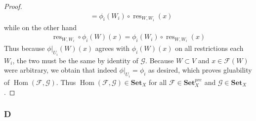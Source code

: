 \documentclass{article}
\newcommand{\fF}{\mathscr{F}}
\newcommand{\fG}{\mathscr{G}}
\newcommand{\Set}{\mathbf{Set}} %
\DeclareMathOperator{\res}{\mathrm{res}}
\DeclareMathOperator{\Hom}{\mathrm{Hom}}
\begin{document}
\begin{proof}
\begin{align*}
        &= \phi_i(W_i)\circ \res_{W,W_i}(x)
    \end{align*}
    while on the other hand
    \begin{align*}
        \res_{W,W_i}\circ \phi_i(W)(x)=\phi_i(W_i)\circ \res_{W,W_i}(x)
    \end{align*}
    Thus because $\phi\vert_{U_i}(W)(x)$ agrees with $\phi_i(W)(x)$ on all restrictions each $W_i$, the two must be the same by identity of $\fG$. Because $W\subset V$ and $x\in \fF(W)$ were arbitrary, we obtain that indeed $\phi\vert_{U_i}=\phi_i$ as desired, which proves gluability of $\Hom(\fF,\fG)$. Thus $\Hom(\fF,\fG)\in \Set_X$ for all $\fF\in \Set_X^{pre}$ and $\fG\in \Set_X$.
\end{proof}
\subsubsection{D}\label{2.3.D}
\end{document}
